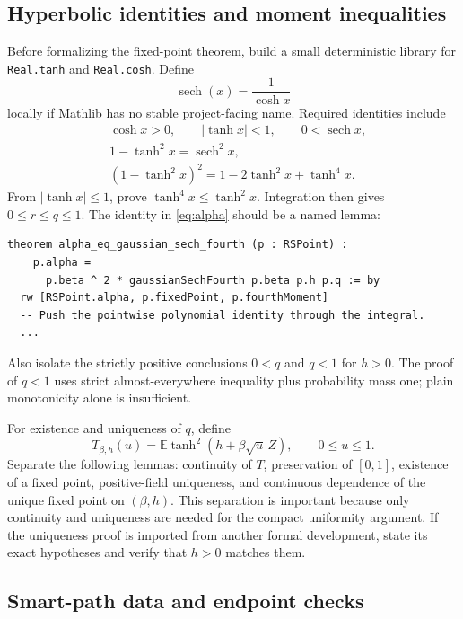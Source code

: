 \documentclass[11pt]{article}
\numberwithin{equation}{section}
\newcommand{\E}{\mathbb{E}}
\newcommand{\1}{\mathbf 1}
\begin{document}
\subsection{Hyperbolic identities and moment inequalities}

Before formalizing the fixed-point theorem, build a small deterministic
library for \texttt{Real.tanh} and \texttt{Real.cosh}.  Define
\[
 \operatorname{sech}(x)=\frac1{\cosh x}
\]
locally if Mathlib has no stable project-facing name.  Required identities
include
\begin{align*}
&\cosh x>0,\qquad |\tanh x|<1,\qquad 0<\operatorname{sech}x,\\
&1-\tanh^2x=\operatorname{sech}^2x,\\
&(1-\tanh^2x)^2
 =1-2\tanh^2x+\tanh^4x.
\end{align*}
From $|\tanh x|\le1$, prove $\tanh^4x\le\tanh^2x$.  Integration then gives
$0\le r\le q\le1$.  The identity in \eqref{eq:alpha} should be a named
lemma:
\begin{lstlisting}
theorem alpha_eq_gaussian_sech_fourth (p : RSPoint) :
    p.alpha =
      p.beta ^ 2 * gaussianSechFourth p.beta p.h p.q := by
  rw [RSPoint.alpha, p.fixedPoint, p.fourthMoment]
  -- Push the pointwise polynomial identity through the integral.
  ...
\end{lstlisting}
Also isolate the strictly positive conclusions $0<q$ and $q<1$ for $h>0$.
The proof of $q<1$ uses strict almost-everywhere inequality plus probability
mass one; plain monotonicity alone is insufficient.

For existence and uniqueness of $q$, define
\[
 T_{\beta,h}(u)=\E\tanh^2(h+\beta\sqrt u\,Z),
 \qquad 0\le u\le1.
\]
Separate the following lemmas: continuity of $T$, preservation of $[0,1]$,
existence of a fixed point, positive-field uniqueness, and continuous
dependence of the unique fixed point on $(\beta,h)$.  This separation is
important because only continuity and uniqueness are needed for the compact
uniformity argument.  If the uniqueness proof is imported from another
formal development, state its exact hypotheses and verify that $h>0$ matches
them.

\subsection{Smart-path data and endpoint checks}
\end{document}
